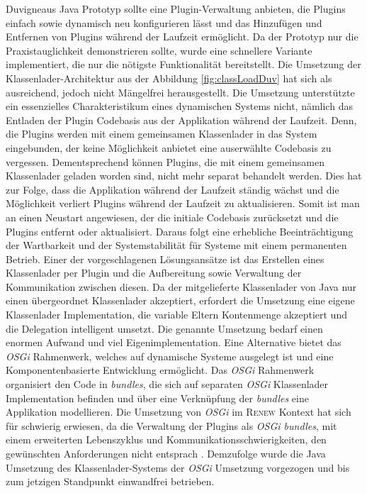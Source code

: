 			Duvigneaus Java Prototyp \cite{Duvigneau09} sollte eine Plugin-Verwaltung anbieten, die Plugins einfach sowie dynamisch neu konfigurieren lässt und das Hinzufügen und Entfernen von Plugins während der Laufzeit ermöglicht. Da der Prototyp nur die Praxistauglichkeit demonstrieren sollte, wurde eine schnellere Variante implementiert, die nur die nötigste Funktionalität bereitstellt. Die Umsetzung der Klassenlader-Architektur aus der Abbildung \ref{fig:classLoadDuv} hat sich als ausreichend, jedoch nicht Mängelfrei herausgestellt. Die Umsetzung unterstützte ein essenzielles Charakteristikum eines dynamischen Systems nicht, nämlich das Entladen der Plugin Codebasis aus der Applikation während der Laufzeit. Denn, die Plugins werden mit einem gemeinsamen Klassenlader in das System eingebunden, der keine Möglichkeit anbietet eine auserwählte Codebasis zu vergessen. Dementsprechend können Plugins, die mit einem gemeinsamen Klassenlader geladen worden sind, nicht mehr separat behandelt werden. Dies hat zur Folge, dass die Applikation während der Laufzeit ständig wächst und die Möglichkeit verliert Plugins während der Laufzeit zu aktualisieren. Somit ist man an einen Neustart angewiesen, der die initiale Codebasis zurücksetzt und die Plugins entfernt oder aktualisiert. Daraus folgt eine erhebliche Beeinträchtigung der Wartbarkeit und der Systemstabilität für Systeme mit einem permanenten Betrieb. \bigbreak
			Einer der vorgeschlagenen Lösungsansätze ist das Erstellen eines Klassenlader per Plugin und die Aufbereitung sowie Verwaltung der Kommunikation zwischen diesen. Da der mitgelieferte Klassenlader von Java nur einen übergeordnet Klassenlader akzeptiert, erfordert die Umsetzung eine eigene Klassenlader Implementation, die variable Eltern Kontenmenge akzeptiert und die Delegation intelligent umsetzt.\newline
			Die genannte Umsetzung bedarf einen enormen Aufwand und viel Eigenimplementation. Eine Alternative bietet das \textit{OSGi} Rahmenwerk, welches auf dynamische Systeme ausgelegt ist und eine Komponentenbasierte Entwicklung ermöglicht. Das \textit{OSGi} Rahmenwerk organisiert den Code in \textit{bundles}, die sich auf separaten \textit{OSGi} Klassenlader Implementation befinden und über eine Verknüpfung der \textit{bundles} eine Applikation modellieren. \newline
			Die Umsetzung von \textit{OSGi} im \textsc{Renew} Kontext hat sich für schwierig erwiesen, da die Verwaltung der Plugins als \textit{OSGi bundles}, mit einem erweiterten Lebenszyklus und Kommunikationsschwierigkeiten, den gewünschten Anforderungen nicht entsprach \cite{Duvigneau09}. Demzufolge wurde die Java Umsetzung des Klassenlader-Systems der \textit{OSGi} Umsetzung vorgezogen und bis zum jetzigen Standpunkt einwandfrei betrieben. \bigbreak

